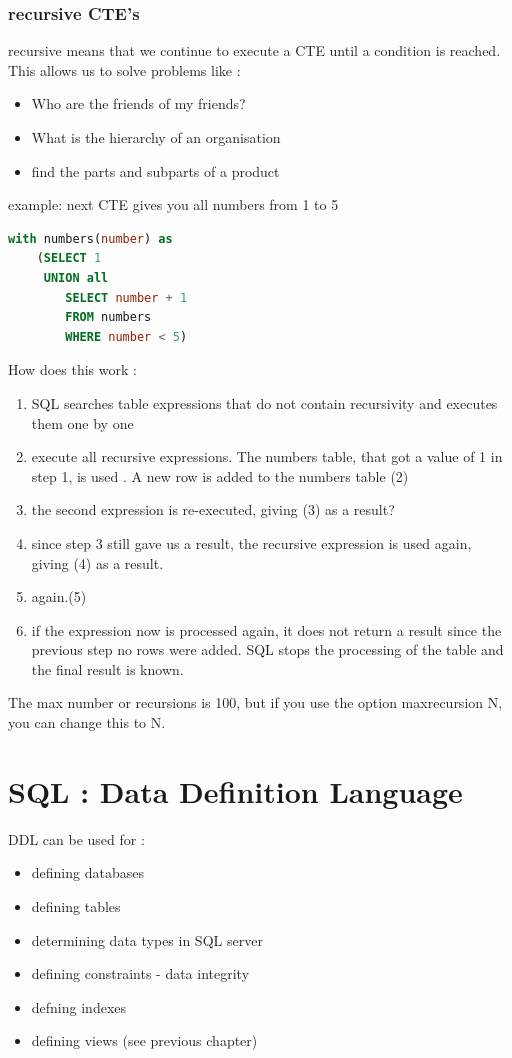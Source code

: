 \documentclass{report}
\begin{document}
	\subsection{recursive CTE's}
	recursive means that we continue to execute a CTE until a condition is reached.
	This allows us to solve problems like : 
	\begin{itemize}
		\item Who are the friends of my friends?
		\item What is the hierarchy of an organisation
		\item find the parts and subparts of a product
	\end{itemize}
	example: next CTE gives you all numbers from 1 to 5
	\begin{lstlisting}[language=sql]
with numbers(number) as 
	(SELECT 1
	 UNION all
	 	SELECT number + 1
	 	FROM numbers
	 	WHERE number < 5)\end{lstlisting}
	 How does this work : 
	 \begin{enumerate}
	 	\item SQL searches table expressions that do not contain recursivity and executes them one by one
	 	\item execute all recursive expressions. The numbers table, that got a value of 1 in step 1, is used . A new row is added to the numbers table (2)
	 	\item the second expression is re-executed, giving (3) as a result?
	 	\item since step 3 still gave us a result, the recursive expression is used again, giving (4) as a result. 
	 	\item again.(5)
	 	\item if the expression now is processed again, it does not return a result since the previous step no rows were added. SQL stops the processing of the table and the final result is known.
	 \end{enumerate}
 	The max number or recursions is 100, but if you use the option maxrecursion N, you can change this to N. 
 	
 	\chapter{SQL : Data Definition Language}
 	DDL can be used for : 
 	\begin{itemize}
 		\item defining databases
 		\item defining tables
 		\item determining data types in SQL server
 		\item defining constraints - data integrity
 		\item defning indexes 
 		\item defining views (see previous chapter)
 	\end{itemize}
\end{document}
